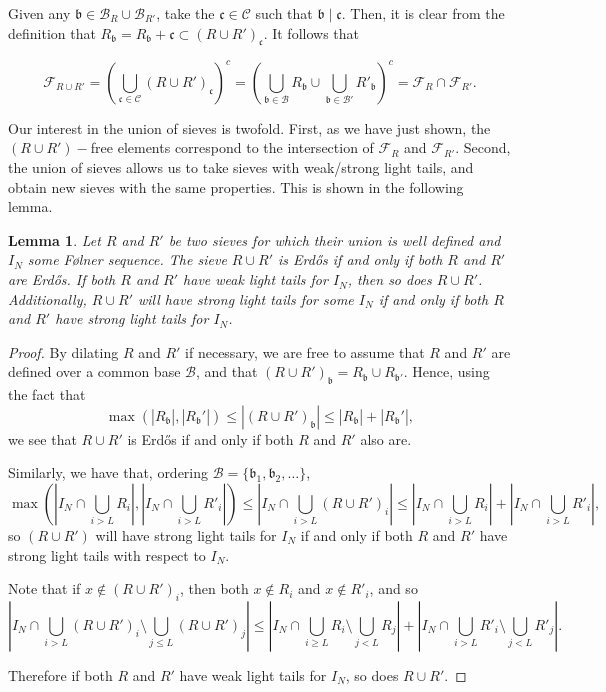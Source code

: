 \documentclass[a4paper,11pt,reqno]{amsart}
\theoremstyle{plain}
\newtheorem{lemma}[theorem]{Lemma}
\theoremstyle{remark}
\newcommand{\cb}{\mathcal{B}}
\newcommand{\fr}{\mathcal{F}_R}
\newcommand{\frp}{\mathcal{F}_{R'}}
\newcommand{\gb}{\mathfrak{b}}
\newcommand{\gc}{\mathfrak{c}}
\begin{document}
			Given any $\gb \in \cb_R \cup \cb_{R'}$, take the $\gc \in \mathcal{C}$ such that $\gb \mid \gc$. Then, it is clear from the definition that $R_\gb = R_\gb + \gc \subset (R \cup R')_{\gc}$. It follows that 
	
			
			$$\mathcal{F}_{R \cup R'} = \left(\bigcup_{\gc \in \mathcal{C}} (R \cup R')_{\gc}\right)^c 
			= \left( \bigcup_{\gb \in \cb} R_\gb \cup \bigcup_{\gb \in \cb'} R'_\gb\right)^c = \fr \cap \frp. $$  
			
			Our interest in the union of sieves is twofold. First, as we have just shown, the $(R\cup R')-$free elements correspond to the intersection of $\fr$ and $\frp$. Second, the union of sieves allows us to take sieves with weak/strong light tails, and obtain new sieves with the same properties. This is shown in the following lemma.
			
			\begin{lemma}
				\label{lm: union of sieves}
				Let $R$ and $R'$ be two sieves for which their union is well defined and $I_N$ some Følner sequence. The sieve $R \cup R'$ is Erdős if and only if both $R$ and $R'$ are Erdős. If both $R$ and $R'$ have weak light tails for $I_N$, then so does $R \cup R'$. Additionally, $R \cup R'$ will have strong light tails for some $I_N$ if and only if both $R$ and $R'$ have strong light tails for $I_N$.
				
			
			\end{lemma}
			
			\begin{proof}
				By dilating $R$ and $R'$ if necessary, we are free to assume that $R$ and $R'$ are defined over a common base $\cb$, and that $(R \cup R')_\gb = R_\gb \cup R_{\gb'}$. Hence, using the fact that $$\max(|R_\gb|,|R_\gb'|) \leq |(R \cup R')_\gb| \leq |R_\gb|+|R_\gb'|,$$ we see that $R \cup R'$ is Erdős if and only if both $R$ and $R'$ also are.
				
				Similarly, we have that, ordering $\cb = \{\gb_1,\gb_2,\dots\}$,
				$$ \max\left(\left|I_N \cap \bigcup_{i > L} R_i \right|, \left|I_N \cap \bigcup_{i> L} R'_i \right|\right)  \leq \left|I_N \cap \bigcup_{i>L} (R\cup R')_{i}\right| \leq \left|I_N \cap \bigcup_{i> L} R_i \right| + \left|I_N \cap \bigcup_{i>L} R'_i \right|, $$  so $(R \cup R')$ will have strong light tails for $I_N$ if and only if both $R$ and $R'$ have strong light tails with respect to $I_N$.
				
				Note that if $x \not \in (R \cup R')_i$, then both $x \not \in R_i$ and $x \not \in R'_i$, and so
				$$\left|I_N \cap \bigcup_{i>L} (R\cup R')_{i} \setminus \bigcup_{j \leq L}(R\cup R')_{j}\right| \leq \left|I_N \cap \bigcup_{i\geq L} R_i\setminus \bigcup_{j<L} R_j \right| + \left|I_N \cap \bigcup_{i> L} R'_i\setminus \bigcup_{j<L} R'_j \right|.$$
			
				Therefore if both $R$ and $R'$ have weak light tails for $I_N$, so does $R \cup R'$. 
			\end{proof}
			
\end{document}
